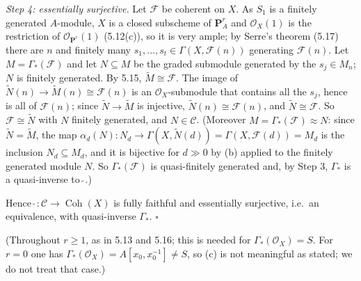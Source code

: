 \documentclass[11pt]{article}
\begin{document}
\emph{Step 4: essentially surjective.} Let $\mathcal F$ be coherent on $X$. As $S_1$ is a finitely generated $A$-module, $X$ is a closed subscheme of $\mathbf P^r_A$ and $\mathcal O_X(1)$ is the restriction of $\mathcal O_{\mathbf P^r}(1)$ (5.12(c)), so it is very ample; by Serre's theorem (5.17) there are $n$ and finitely many $s_1,\dots,s_t\in\Gamma(X,\mathcal F(n))$ generating $\mathcal F(n)$. Let $M=\Gamma_*(\mathcal F)$ and let $N\subseteq M$ be the graded submodule generated by the $s_j\in M_n$; $N$ is finitely generated. By 5.15, $\widetilde M\cong\mathcal F$. The image of $\widetilde N(n)\to\widetilde M(n)\cong\mathcal F(n)$ is an $\mathcal O_X$-submodule that contains all the $s_j$, hence is all of $\mathcal F(n)$; since $\widetilde N\to\widetilde M$ is injective, $\widetilde N(n)\cong\mathcal F(n)$, and $\widetilde N\cong\mathcal F$. So $\mathcal F\cong\widetilde N$ with $N$ finitely generated, and $N\in\mathcal C$. (Moreover $M=\Gamma_*(\mathcal F)\approx N$: since $\widetilde N=\widetilde M$, the map $\alpha_d(N):N_d\to\Gamma(X,\widetilde N(d))=\Gamma(X,\mathcal F(d))=M_d$ is the inclusion $N_d\subseteq M_d$, and it is bijective for $d\gg0$ by (b) applied to the finitely generated module $N$. So $\Gamma_*(\mathcal F)$ is quasi-finitely generated and, by Step 3, $\Gamma_*$ is a quasi-inverse to $\widetilde{\ }$.)

Hence $\widetilde{\ }:\mathcal C\to\operatorname{Coh}(X)$ is fully faithful and essentially surjective, i.e.\ an equivalence, with quasi-inverse $\Gamma_*$. \hfill$\square$

\pf
(Throughout $r\ge1$, as in 5.13 and 5.16; this is needed for $\Gamma_*(\mathcal O_X)=S$. For $r=0$ one has $\Gamma_*(\mathcal O_X)=A[x_0,x_0^{-1}]\neq S$, so (c) is not meaningful as stated; we do not treat that case.)
\end{document}

